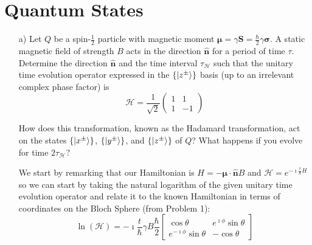 \documentclass[a4paper,twoside]{article}
\begin{document}
\section{Quantum States}%
\label{sec:quantum_states}

\begin{itemize}
    \item[a)] Let $Q$ be a spin-$ \frac{1}{2}$ particle with magnetic moment $\bm{\mu} = \gamma \bm{S} = \frac{\hbar}{2}\gamma\bm{\sigma}$. A static magnetic field of strength $B$ acts in the direction $\mathbf{\hat{n}}$ for a period of time $\tau$. Determine the direction $\mathbf{\hat{n}}$ and the time interval $\tau_\mathcal{H}$ such that the unitary time evolution operator expressed in the $\{\ket{z^\pm}\} $ basis (up to an irrelevant complex phase factor) is
\begin{equation}
    \mathcal{H} = \frac{1}{\sqrt{2} }\begin{pmatrix} 1&1\\1&-1 \end{pmatrix} 
\end{equation}

How does this transformation, known as the Hadamard transformation, act on the states $\{\ket{x^\pm}\} $, $\{\ket{y^\pm}\} $, and $\{\ket{z^\pm}\} $ of $Q$? What happens if you evolve for time $2\tau_\mathcal{H}$?

\begin{tcolorbox}[breakable]
    We start by remarking that our Hamiltonian is $H=-\bm{\mu}\cdot \bm{\hat{n}}B$ and $\mathcal{H} = e^{-\imath \frac{t}{\hbar}H}$ so we can start by taking the natural logarithm of the given unitary time evolution operator and relate it to the known Hamiltonian in terms of coordinates on the Bloch Sphere (from Problem 1):
    \begin{equation}
        \ln(\mathcal{H}) = -\imath \frac{t}{\hbar}\gamma B \frac{\hbar}{2}\begin{bmatrix} \cos\theta & e^{\imath\phi}\sin\theta \\ e^{-\imath\phi}\sin\theta & -\cos\theta  \end{bmatrix}
    \end{equation}
    

\end{tcolorbox}
\end{itemize}
\end{document}

